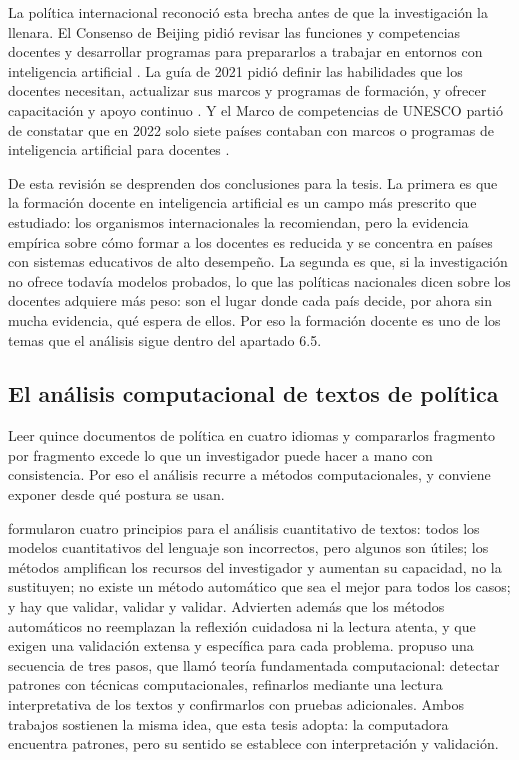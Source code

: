 La política internacional reconoció esta brecha antes de que la investigación la llenara.
El Consenso de Beijing pidió revisar las funciones y competencias docentes y desarrollar
programas para prepararlos a trabajar en entornos con inteligencia artificial
\citep[párr.~13]{unesco2019beijing}. La guía de 2021 pidió definir las habilidades que los
docentes necesitan, actualizar sus marcos y programas de formación, y ofrecer capacitación
y apoyo continuo \citep[p.~35]{miao2021guidance}. Y el Marco de competencias de UNESCO
partió de constatar que en 2022 solo siete países contaban con marcos o programas de
inteligencia artificial para docentes \citep[p.~13]{unesco2024aicft}.

De esta revisión se desprenden dos conclusiones para la tesis. La primera es que la
formación docente en inteligencia artificial es un campo más prescrito que estudiado: los
organismos internacionales la recomiendan, pero la evidencia empírica sobre cómo formar a
los docentes es reducida y se concentra en países con sistemas educativos de alto
desempeño. La segunda es que, si la investigación no ofrece todavía modelos probados, lo que
las políticas nacionales dicen sobre los docentes adquiere más peso: son el lugar donde cada
país decide, por ahora sin mucha evidencia, qué espera de ellos. Por eso la formación
docente es uno de los temas que el análisis sigue dentro del apartado 6.5.

\subsection{El análisis computacional de textos de política}
\label{subsec:mt-computacional}

Leer quince documentos de política en cuatro idiomas y compararlos fragmento por fragmento
excede lo que un investigador puede hacer a mano con consistencia. Por eso el análisis
recurre a métodos computacionales, y conviene exponer desde qué postura se usan.

\citet{grimmer2013text} formularon cuatro principios para el análisis cuantitativo de
textos: todos los modelos cuantitativos del lenguaje son incorrectos, pero algunos son
útiles; los métodos amplifican los recursos del investigador y aumentan su capacidad, no la
sustituyen; no existe un método automático que sea el mejor para todos los casos; y hay que
validar, validar y validar. Advierten además que los métodos automáticos no reemplazan la
reflexión cuidadosa ni la lectura atenta, y que exigen una validación extensa y específica
para cada problema. \citet{nelson2020computational} propuso una secuencia de tres pasos,
que llamó teoría fundamentada computacional: detectar patrones con técnicas
computacionales, refinarlos mediante una lectura interpretativa de los textos y
confirmarlos con pruebas adicionales. Ambos trabajos sostienen la misma idea, que esta
tesis adopta: la computadora encuentra patrones, pero su sentido se establece con
interpretación y validación.

